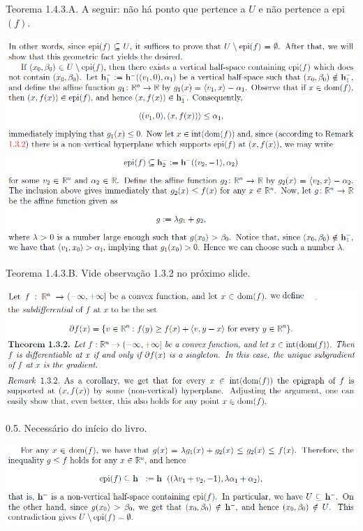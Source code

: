 \documentclass[12pt]{article}
\begin{document}
Teorema 1.4.3.A. A seguir: n\~ao h\'a ponto que pertence a $U$ e n\~ao pertence a epi$(f)$.

\vspace{300mm}

		\begin{center}
		\includegraphics{7a}
		\end{center}

Teorema 1.4.3.B. Vide observa\c{c}\~ao 1.3.2 no pr\'oximo slide.

\vspace{300mm}

		\begin{center}
		\includegraphics[scale=1.25]{7b}
		\end{center}

0.5. Necess\'ario do in\'icio do livro.

\vspace{300mm}

		\begin{center}
		\includegraphics[scale=1.25]{8}
		\end{center}
\end{document}
